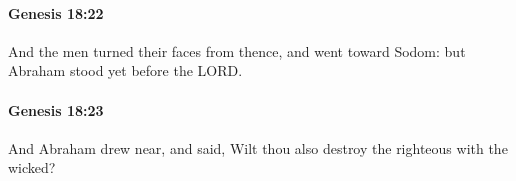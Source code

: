 		\paragraph{Genesis 18:22} %
			\label{GENESIS-18-22}

			And the men turned their faces from thence, and went toward Sodom: but Abraham stood yet before the LORD.


		\paragraph{Genesis 18:23} %
			\label{GENESIS-18-23}

			And Abraham drew near, and said, Wilt thou also destroy the righteous with the wicked?


